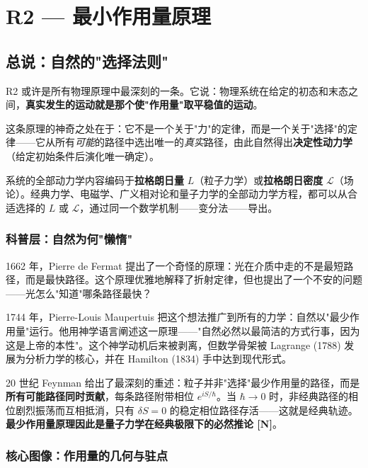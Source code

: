 \chapter{R2 — 最小作用量原理}
\label{ch:r2}

\section{总说：自然的"选择法则"}

R2 或许是所有物理原理中最深刻的一条。它说：物理系统在给定的初态和末态之间，\textbf{真实发生的运动就是那个使"作用量"取平稳值的运动}。

这条原理的神奇之处在于：它不是一个关于"力"的定律，而是一个关于"选择"的定律——它从所有\emph{可能}的路径中选出唯一的\emph{真实}路径，由此自然得出\textbf{决定性动力学}（给定初始条件后演化唯一确定）。

系统的全部动力学内容编码于\textbf{拉格朗日量} $L$（粒子力学）或\textbf{拉格朗日密度} $\mathcal{L}$（场论）。经典力学、电磁学、广义相对论和量子力学的全部动力学方程，都可以从合适选择的 $L$ 或 $\mathcal{L}$，通过同一个数学机制——变分法——导出。

\subsection{科普层：自然为何"懒惰"}

1662 年，Pierre de Fermat 提出了一个奇怪的原理：光在介质中走的不是最短路径，而是最快路径。这个原理优雅地解释了折射定律，但也提出了一个不安的问题——光怎么"知道"哪条路径最快？

1744 年，Pierre-Louis Maupertuis 把这个想法推广到所有的力学：自然以"最少作用量"运行。他用神学语言阐述这一原理——"自然必然以最简洁的方式行事，因为这是上帝的本性"。这个神学动机后来被剥离，但数学骨架被 Lagrange (1788) 发展为分析力学的核心，并在 Hamilton (1834) 手中达到现代形式。

20 世纪 Feynman 给出了最深刻的重述：粒子并非"选择"最少作用量的路径，而是\textbf{所有可能路径同时贡献}，每条路径附带相位 $e^{iS/\hbar}$。当 $\hbar \to 0$ 时，非经典路径的相位剧烈振荡而互相抵消，只有 $\delta S = 0$ 的稳定相位路径存活——这就是经典轨迹。\textbf{最少作用量原理因此是量子力学在经典极限下的必然推论 [N]}。

\subsection{核心图像：作用量的几何与驻点}

